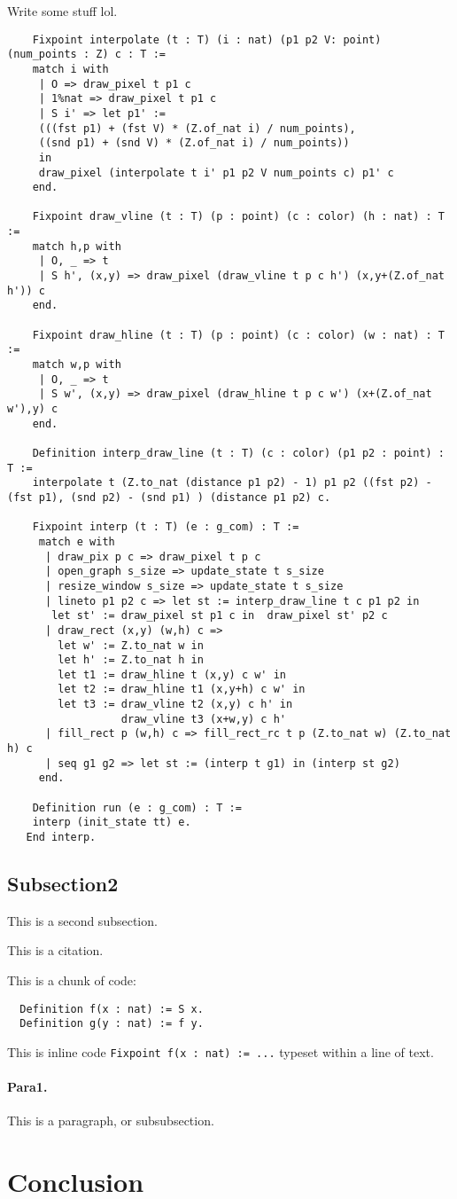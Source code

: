 \documentclass{llncs}
\begin{document}
  Write some stuff lol.
 \begin{lstlisting}
    Fixpoint interpolate (t : T) (i : nat) (p1 p2 V: point) (num_points : Z) c : T :=
    match i with
     | O => draw_pixel t p1 c
     | 1%nat => draw_pixel t p1 c
     | S i' => let p1' :=
     (((fst p1) + (fst V) * (Z.of_nat i) / num_points),
     ((snd p1) + (snd V) * (Z.of_nat i) / num_points))
     in
     draw_pixel (interpolate t i' p1 p2 V num_points c) p1' c 
    end.

    Fixpoint draw_vline (t : T) (p : point) (c : color) (h : nat) : T :=
    match h,p with
     | O, _ => t
     | S h', (x,y) => draw_pixel (draw_vline t p c h') (x,y+(Z.of_nat h')) c
    end.

    Fixpoint draw_hline (t : T) (p : point) (c : color) (w : nat) : T :=
    match w,p with
     | O, _ => t
     | S w', (x,y) => draw_pixel (draw_hline t p c w') (x+(Z.of_nat w'),y) c
    end.

    Definition interp_draw_line (t : T) (c : color) (p1 p2 : point) : T :=
    interpolate t (Z.to_nat (distance p1 p2) - 1) p1 p2 ((fst p2) - (fst p1), (snd p2) - (snd p1) ) (distance p1 p2) c.
  
    Fixpoint interp (t : T) (e : g_com) : T :=
     match e with
      | draw_pix p c => draw_pixel t p c
      | open_graph s_size => update_state t s_size
      | resize_window s_size => update_state t s_size 
      | lineto p1 p2 c => let st := interp_draw_line t c p1 p2 in 
       let st' := draw_pixel st p1 c in  draw_pixel st' p2 c
      | draw_rect (x,y) (w,h) c =>
        let w' := Z.to_nat w in
        let h' := Z.to_nat h in
        let t1 := draw_hline t (x,y) c w' in
        let t2 := draw_hline t1 (x,y+h) c w' in
        let t3 := draw_vline t2 (x,y) c h' in
                  draw_vline t3 (x+w,y) c h'
      | fill_rect p (w,h) c => fill_rect_rc t p (Z.to_nat w) (Z.to_nat h) c
      | seq g1 g2 => let st := (interp t g1) in (interp st g2)
     end.
  
    Definition run (e : g_com) : T :=
    interp (init_state tt) e.
   End interp.

 \end{lstlisting}


\subsection{Subsection2} This is a second subsection.

This is a citation.~\cite{gennaro2010non}

This is a chunk of code:
\begin{lstlisting}
  Definition f(x : nat) := S x.
  Definition g(y : nat) := f y.
\end{lstlisting}

This is inline code \lstinline|Fixpoint f(x : nat) := ...| typeset within a line of text.

\paragraph{Para1.} This is a paragraph, or subsubsection.

\section{Conclusion}



\end{document}
